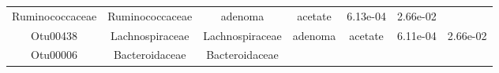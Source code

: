 \documentclass[11pt,]{article}
\begin{document}
\begin{longtable}[]{@{}ccccccc@{}}
\begin{minipage}[t]{0.17\columnwidth}
Ruminococcaceae\strut
\end{minipage} & \begin{minipage}[t]{0.17\columnwidth}\centering\strut
Ruminococcaceae\strut
\end{minipage} & \begin{minipage}[t]{0.09\columnwidth}\centering\strut
adenoma\strut
\end{minipage} & \begin{minipage}[t]{0.11\columnwidth}\centering\strut
acetate\strut
\end{minipage} & \begin{minipage}[t]{0.09\columnwidth}\centering\strut
6.13e-04\strut
\end{minipage} & \begin{minipage}[t]{0.09\columnwidth}\centering\strut
2.66e-02\strut
\end{minipage}\tabularnewline
\begin{minipage}[t]{0.09\columnwidth}\centering\strut
Otu00438\strut
\end{minipage} & \begin{minipage}[t]{0.17\columnwidth}\centering\strut
Lachnospiraceae\strut
\end{minipage} & \begin{minipage}[t]{0.17\columnwidth}\centering\strut
Lachnospiraceae\strut
\end{minipage} & \begin{minipage}[t]{0.09\columnwidth}\centering\strut
adenoma\strut
\end{minipage} & \begin{minipage}[t]{0.11\columnwidth}\centering\strut
acetate\strut
\end{minipage} & \begin{minipage}[t]{0.09\columnwidth}\centering\strut
6.11e-04\strut
\end{minipage} & \begin{minipage}[t]{0.09\columnwidth}\centering\strut
2.66e-02\strut
\end{minipage}\tabularnewline
\begin{minipage}[t]{0.09\columnwidth}\centering\strut
Otu00006\strut
\end{minipage} & \begin{minipage}[t]{0.17\columnwidth}\centering\strut
Bacteroidaceae\strut
\end{minipage} & \begin{minipage}[t]{0.17\columnwidth}\centering\strut
Bacteroidaceae\strut
\end{minipage} & \begin{minipage}[t]{0.09\columnwidth}\centering\strut

\end{minipage}
\end{longtable}
\end{document}
